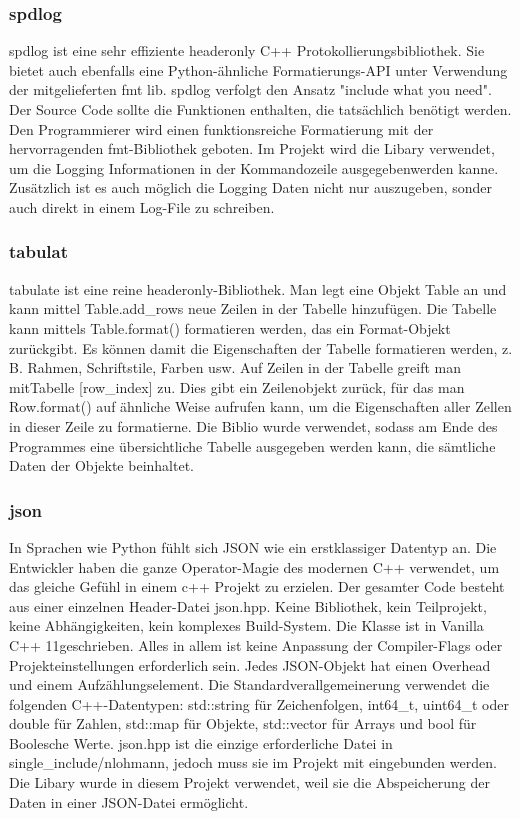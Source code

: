 \documentclass[a4paper,12pt]{article}
\begin{document}
\subsubsection{spdlog}
spdlog ist eine sehr effiziente headeronly C++ Protokollierungsbibliothek. Sie bietet auch ebenfalls eine Python-ähnliche Formatierungs-API unter Verwendung der mitgelieferten fmt lib.
spdlog verfolgt den Ansatz "include what you need". Der Source Code sollte die Funktionen enthalten, die tatsächlich benötigt werden.
Den Programmierer wird einen funktionsreiche Formatierung mit der hervorragenden fmt-Bibliothek geboten.
Im Projekt wird die Libary verwendet, um die Logging Informationen in der Kommandozeile ausgegebenwerden kanne. Zusätzlich ist es auch möglich
die Logging Daten nicht nur auszugeben, sonder auch direkt in einem Log-File zu schreiben.

\subsubsection{tabulat}
tabulate ist eine reine headeronly-Bibliothek. 
Man legt eine Objekt Table an und kann mittel Table.add\_rows neue Zeilen in der Tabelle hinzufügen.
Die Tabelle kann mittels Table.format() formatieren werden, das ein Format-Objekt zurückgibt. 
Es können damit die Eigenschaften der Tabelle formatieren werden, z. B. Rahmen, Schriftstile, Farben usw.
Auf Zeilen in der Tabelle greift man mitTabelle [row\_index] zu. Dies gibt ein Zeilenobjekt zurück, für das man Row.format() auf ähnliche Weise aufrufen kann, um die Eigenschaften aller Zellen in dieser Zeile zu formatierne.
Die Biblio wurde verwendet, sodass am Ende des Programmes eine übersichtliche Tabelle ausgegeben werden kann, die sämtliche Daten der Objekte
beinhaltet.
\subsubsection{json}
In Sprachen wie Python fühlt sich JSON wie ein erstklassiger Datentyp an. 
Die Entwickler haben die ganze Operator-Magie des modernen C++ verwendet, um das gleiche Gefühl in einem c++ Projekt zu erzielen. 
Der gesamter Code besteht aus einer einzelnen Header-Datei json.hpp. Keine Bibliothek, kein Teilprojekt, keine Abhängigkeiten, kein komplexes Build-System. 
Die Klasse ist in Vanilla C++ 11geschrieben. Alles in allem ist keine Anpassung der Compiler-Flags oder Projekteinstellungen erforderlich sein.
Jedes JSON-Objekt hat einen Overhead und einem Aufzählungselement. Die Standardverallgemeinerung verwendet die folgenden C++-Datentypen: std::string für Zeichenfolgen, int64\_t, uint64\_t oder double für Zahlen, std::map für Objekte, std::vector für Arrays und bool für Boolesche Werte. 
json.hpp ist die einzige erforderliche Datei in single\_include/nlohmann, jedoch muss sie im Projekt mit eingebunden werden. 
Die Libary wurde in diesem Projekt verwendet, weil sie die Abspeicherung der Daten in einer JSON-Datei ermöglicht.
\end{document}
